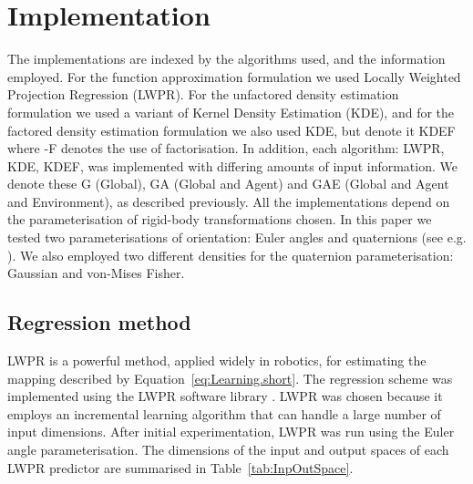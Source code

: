 \section{Implementation}\label{sec:Implementation}

\newcommand{\bx}{\mathbf{x}}
\newcommand{\by}{\mathbf{y}}

The implementations are indexed by the algorithms used, and the information employed. For the function approximation formulation we used Locally Weighted Projection Regression (LWPR). For the unfactored density estimation formulation we used a variant of Kernel Density Estimation (KDE), and for the factored density estimation formulation we also used KDE, but denote it KDEF where -F denotes the use of factorisation. In addition, each algorithm: LWPR, KDE, KDEF, was implemented with differing amounts of input information. We denote these G (Global), GA (Global and Agent) and GAE (Global and Agent and Environment), as described previously. All the implementations depend on the parameterisation of rigid-body transformations chosen. In this paper we tested two parameterisations of orientation: Euler angles and quaternions (see e.g. \citep{murray_mathematical_1994}). We also employed two different densities for the quaternion parameterisation: Gaussian and von-Mises Fisher.

\subsection{Regression method}\label{sec:Implementation.regression}

LWPR \citep{vijayakumar_incremental_2005} is a powerful method,  applied widely in robotics, for estimating the mapping described by Equation~\eqref{eq:Learning.short}. The regression scheme was implemented using the LWPR software library \citep{klanke_library_2008}. LWPR was chosen because it employs an incremental learning algorithm that can handle a large number of input dimensions. After initial experimentation, LWPR was run using the Euler angle parameterisation. The dimensions of the input and output spaces of each LWPR predictor are summarised in Table~\ref{tab:InpOutSpace}.


